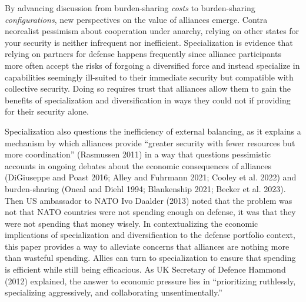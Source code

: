 \documentclass[
  12,
  letterpaper,
  DIV=11,
  numbers=noendperiod]{scrartcl}
\begin{document}
By advancing discussion from burden-sharing \emph{costs} to
burden-sharing \emph{configurations}, new perspectives on the value of
alliances emerge. Contra neorealist pessimism about cooperation under
anarchy, relying on other states for your security is neither infrequent
nor inefficient. Specialization is evidence that relying on partners for
defense happens frequently since alliance participants more often accept
the risks of forgoing a diversified force and instead specialize in
capabilities seemingly ill-suited to their immediate security but
compatible with collective security. Doing so requires trust that
alliances allow them to gain the benefits of specialization and
diversification in ways they could not if providing for their security
alone.

Specialization also questions the inefficiency of external balancing, as
it explains a mechanism by which alliances provide ``greater security
with fewer resources but more coordination'' (Rasmussen 2011) in a way
that questions pessimistic accounts in ongoing debates about the
economic consequences of alliances (DiGiuseppe and Poast 2016; Alley and
Fuhrmann 2021; Cooley et al. 2022) and burden-sharing (Oneal and Diehl
1994; Blankenship 2021; Becker et al. 2023). Then US ambassador to NATO
Ivo Daalder (2013) noted that the problem was not that NATO countries
were not spending enough on defense, it was that they were not spending
that money wisely. In contextualizing the economic implications of
specialization and diversification to the defense portfolio context,
this paper provides a way to alleviate concerns that alliances are
nothing more than wasteful spending. Allies can turn to specialization
to ensure that spending is efficient while still being efficacious. As
UK Secretary of Defence Hammond (2012) explained, the answer to economic
pressure lies in ``prioritizing ruthlessly, specializing aggressively,
and collaborating unsentimentally.''
\end{document}
